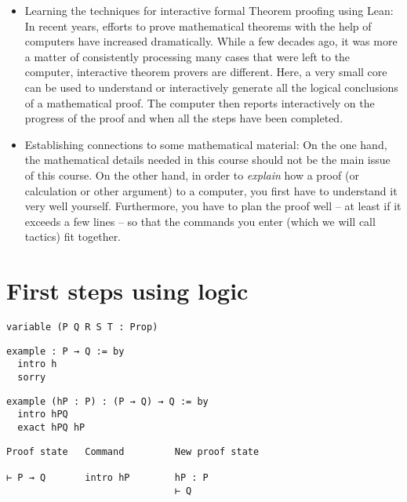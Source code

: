 \documentclass{memoir}
\begin{document}
\begin{itemize}
\item Learning the techniques for interactive formal Theorem proofing using Lean: In recent years, efforts to prove mathematical theorems with the help of computers have increased dramatically. While a few decades ago, it was more a matter of consistently processing many cases that were left to the computer, interactive theorem provers are different. Here, a very small core can be used to understand or interactively generate all the logical conclusions of a mathematical proof. The computer then reports interactively on the progress of the proof and when all the steps have been completed.\item Establishing connections to some mathematical material: On the one hand, the mathematical details needed in this course should not be the main issue of this course. On the other hand, in order to \emph{explain} how a proof (or calculation or other argument) to a computer, you first have to understand it very well yourself. Furthermore, you have to plan the proof well -- at least if it exceeds a few lines -- so that the commands you enter (which we will call tactics) fit together.
\end{itemize}





\chapter{First steps using logic}

\begin{verbatim}
variable (P Q R S T : Prop)

\end{verbatim}



\begin{verbatim}
example : P → Q := by
  intro h
  sorry

\end{verbatim}



\begin{verbatim}
example (hP : P) : (P → Q) → Q := by
  intro hPQ
  exact hPQ hP

\end{verbatim}



\begin{verbatim}
Proof state   Command         New proof state

⊢ P → Q       intro hP        hP : P
                              ⊢ Q

\end{verbatim}
\end{document}
